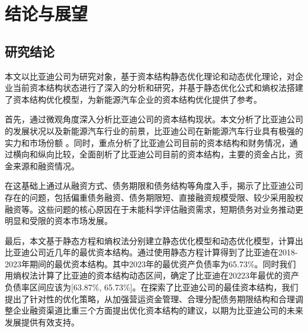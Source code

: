 \chapter{结论与展望}
\section{研究结论}




本文以比亚迪公司为研究对象，基于资本结构静态优化理论和动态优化理论，对企业当前资本结构状态进行了深入的分析和研究，并基于静态优化公式和熵权法搭建了资本结构优化模型，为新能源汽车企业的资本结构优化提供了参考。

首先，通过微观角度深入分析比亚迪公司的资本结构现状。本文分析了比亚迪公司的发展状况以及新能源汽车行业的前景，比亚迪公司在新能源汽车行业具有极强的实力和市场份额 。同时，重点分析了比亚迪公司目前的资本结构和财务情况，通过横向和纵向比较，全面剖析了比亚迪公司目前的资本结构，主要的资金占比，资金来源和融资情况。

在这基础上通过从融资方式、债务期限和债务结构等角度入手，揭示了比亚迪公司存在的问题，包括偏重债务融资、债务期限短、直接融资规模受限、较少采用股权融资等。这些问题的核心原因在于未能科学评估融资需求，短期债务对业务推动更明显和受限的资本市场发展。

最后，本文基于静态方程和熵权法分别建立静态优化模型和动态优化模型，计算出比亚迪公司近几年的最优资本结构。通过使用静态方程计算得到了比亚迪在2018-2023年期间的最优资本结构。其中2023年的最优资产负债率为65.73\%。同时我们用熵权法计算了比亚迪的资本结构动态区间，确定了比亚迪在20223年最优的资产负债率区间应该为[63.87\%, 65.73\%]。在探索了比亚迪公司的最佳资本结构，我们提出了针对性的优化策略，从加强营运资金管理、合理分配债务期限结构和合理调整企业融资渠道比重三个方面提出优化资本结构的建议，以期为比亚迪公司的未来发展提供有效支持。

